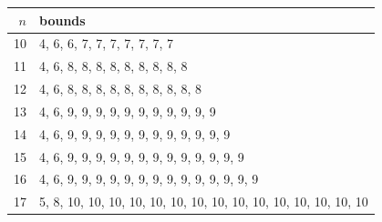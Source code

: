 \begin{tabular}{r|l}
$n$ & bounds \\ \hline
10 & 4, 6, 6, 7, 7, 7, 7, 7, 7, 7 \\
11 & 4, 6, 8, 8, 8, 8, 8, 8, 8, 8, 8 \\
12 & 4, 6, 8, 8, 8, 8, 8, 8, 8, 8, 8, 8 \\
13 & 4, 6, 9, 9, 9, 9, 9, 9, 9, 9, 9, 9, 9 \\
14 & 4, 6, 9, 9, 9, 9, 9, 9, 9, 9, 9, 9, 9, 9 \\
15 & 4, 6, 9, 9, 9, 9, 9, 9, 9, 9, 9, 9, 9, 9, 9 \\
16 & 4, 6, 9, 9, 9, 9, 9, 9, 9, 9, 9, 9, 9, 9, 9, 9 \\
17 & 5, 8, 10, 10, 10, 10, 10, 10, 10, 10, 10, 10, 10, 10, 10, 10, 10 \\
\end{tabular}
